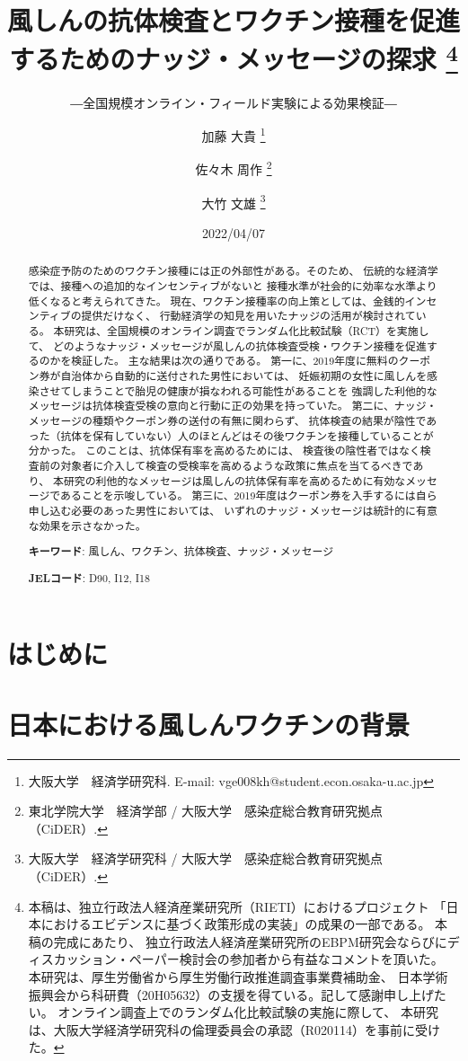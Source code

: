 \documentclass[
  11pt,
  a4paper,
]{article}
\title{風しんの抗体検査とワクチン接種を促進するためのナッジ・メッセージの探求  \thanks{本稿は、独立行政法人経済産業研究所（RIETI）におけるプロジェクト
「日本におけるエビデンスに基づく政策形成の実装」の成果の一部である。
本稿の完成にあたり、
独立行政法人経済産業研究所のEBPM研究会ならびにディスカッション・ペーパー検討会の参加者から有益なコメントを頂いた。
本研究は、厚生労働省から厚生労働行政推進調査事業費補助金、
日本学術振興会から科研費（20H05632）の支援を得ている。記して感謝申し上げたい。
オンライン調査上でのランダム化比較試験の実施に際して、
本研究は、大阪大学経済学研究科の倫理委員会の承認（R020114）を事前に受けた。}  }
\subtitle{―全国規模オンライン・フィールド実験による効果検証―}
\author{
    加藤 大貴
  \thanks{大阪大学　経済学研究科. E-mail: vge008kh@student.econ.osaka-u.ac.jp  }
  \and
    佐々木 周作
  \thanks{東北学院大学　経済学部 / 大阪大学　感染症総合教育研究拠点（CiDER）.  }
  \and
    大竹 文雄
  \thanks{大阪大学　経済学研究科 / 大阪大学　感染症総合教育研究拠点（CiDER）.  }
  \and
  }
\date{2022/04/07}
\begin{document}
\begin{spacing}{1}
  \maketitle
\end{spacing}
\begin{spacing}{1}
  \begin{abstract}
    感染症予防のためのワクチン接種には正の外部性がある。そのため、
    伝統的な経済学では、接種への追加的なインセンティブがないと
    接種水準が社会的に効率な水準より低くなると考えられてきた。
    現在、ワクチン接種率の向上策としては、金銭的インセンティブの提供だけなく、
    行動経済学の知見を用いたナッジの活用が検討されている。
    本研究は、全国規模のオンライン調査でランダム化比較試験（RCT）を実施して、
    どのようなナッジ・メッセージが風しんの抗体検査受検・ワクチン接種を促進するのかを検証した。
    主な結果は次の通りである。
    第一に、2019年度に無料のクーポン券が自治体から自動的に送付された男性においては、
    妊娠初期の女性に風しんを感染させてしまうことで胎児の健康が損なわれる可能性があることを
    強調した利他的なメッセージは抗体検査受検の意向と行動に正の効果を持っていた。
    第二に、ナッジ・メッセージの種類やクーポン券の送付の有無に関わらず、
    抗体検査の結果が陰性であった（抗体を保有していない）人のほとんどはその後ワクチンを接種していることが分かった。
    このことは、抗体保有率を高めるためには、
    検査後の陰性者ではなく検査前の対象者に介入して検査の受検率を高めるような政策に焦点を当てるべきであり、
    本研究の利他的なメッセージは風しんの抗体保有率を高めるために有効なメッセージであることを示唆している。
    第三に、2019年度はクーポン券を入手するには自ら申し込む必要のあった男性においては、
    いずれのナッジ・メッセージは統計的に有意な効果を示さなかった。
    
                \noindent
    \textbf{キーワード}: 風しん、ワクチン、抗体検査、ナッジ・メッセージ
        
        \noindent
    \textbf{JELコード}: D90, I12, I18
            
  \end{abstract}
\end{spacing}

\hypertarget{intro}{%
\section{はじめに}\label{intro}}

\hypertarget{background}{%
\section{日本における風しんワクチンの背景}\label{background}}
\end{document}
